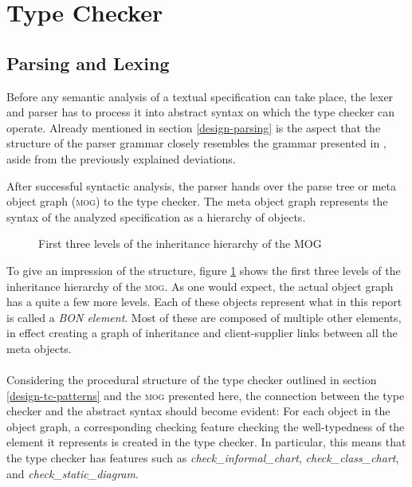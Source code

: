 \section{Type Checker}
\subsection{Parsing and Lexing}
\label{implementation-parser}
Before any semantic analysis of a textual \bon{} specification can take place, the lexer and parser has to process it into abstract syntax on which the type checker can operate. Already mentioned in section \ref{design-parsing} is the aspect that the structure of the parser grammar closely resembles the grammar presented in \cite[pp.~352-359]{walden1995}, aside from the previously explained deviations.

After successful syntactic analysis, the parser hands over the parse tree or meta object graph (\textsc{mog}) to the type checker. The meta object graph represents the syntax of the analyzed specification as a hierarchy of objects.
\begin{figure}[H]
    \centerline{}
    \caption[MOG hierarchy]{First three levels of the inheritance hierarchy of the MOG}
    \label{fig:mog-hierarchy}
\end{figure}
To give an impression of the structure, figure \ref{fig:mog-hierarchy} shows the first three levels of the inheritance hierarchy of the \textsc{mog}. As one would expect, the actual object graph has a quite a few more levels. Each of these objects represent what in this report is called a \textit{BON element}. Most of these are composed of multiple other \bon{} elements, in effect creating a graph of inheritance and client-supplier links between all the meta objects.
\paragraph{}
Considering the procedural structure of the type checker outlined in section \ref{design-tc-patterns} and the \textsc{mog} presented here, the connection between the type checker and the abstract syntax should become evident: For each object in the object graph, a corresponding checking feature checking the well-typedness of the \bon{} element it represents is created in the type checker. In particular, this means that the type checker has features such as \textit{check\_informal\_chart}, \textit{check\_class\_chart}, and \textit{check\_static\_diagram}.

